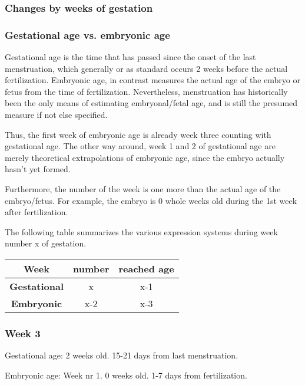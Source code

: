 \documentclass[12pt,a4paper,onecolumn]{article}
\begin{document}
\subsubsection{Changes by weeks of gestation}

\subsubsection{Gestational age vs. embryonic age}

Gestational age is the time that has passed since the onset of the last menstruation, which
generally or as standard occurs 2 weeks before the actual fertilization. Embryonic age, in contrast
measures the actual age of the embryo or fetus from the time of fertilization. Nevertheless,
menstruation has historically been the only means of estimating embryonal/fetal age, and is still
the presumed measure if not else specified.

Thus, the first week of embryonic age is already week three counting with gestational age. The other
way around, week 1 and 2 of gestational age are merely theoretical extrapolations of embryonic age,
since the embryo actually hasn't yet formed.

Furthermore, the number of the week is one more than the actual age of the embryo/fetus. For
example, the embryo is 0 whole weeks old during the 1st week after fertilization.

The following table summarizes the various expression systems during week number x of gestation.
\begin{table}
\begin{center}
\begin{tabular}{ccc}
  \hline
  \textbf{Week} & number & reached age \\
  \hline
  \textbf{Gestational} & x & x-1 \\
  \textbf{Embryonic} & x-2 & x-3 \\
  \hline
\end{tabular}
\end{center}
\end{table}

\subsubsection{Week 3}

Gestational age: 2 weeks old. 15-21 days from last menstruation.

Embryonic age: Week nr 1. 0 weeks old. 1-7 days from fertilization.
\end{document}
